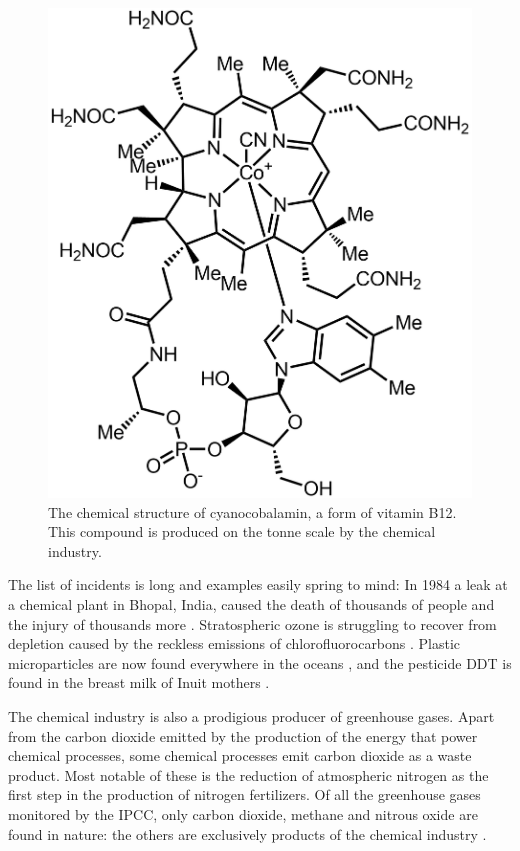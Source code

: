 \begin{figure}
\centering
\includegraphics[width=\textwidth]{Figures/Cyanocobalamin-b12.png}
\decoRule

\caption[Cyanocobalamin]{The chemical structure of cyanocobalamin, a form of
vitamin B12. This compound is produced on the tonne scale by the chemical
industry.}

\label{fig:vitb12}

\end{figure}

The list of incidents is long and examples easily spring to mind: In 1984 a leak
at a chemical plant in Bhopal, India, caused the death of thousands of people
and the injury of thousands more \autocite{Varma2005}.
Stratospheric ozone is struggling to recover from depletion caused by the
reckless emissions of chlorofluorocarbons \autocite{Ball2018}. Plastic
microparticles are now found everywhere in the oceans \autocite{Woodall2014},
and the pesticide DDT is found in the breast milk of Inuit mothers
\autocite{Gibson2016}.

The chemical industry is also a prodigious producer of greenhouse gases. Apart
from the carbon dioxide emitted by the production of the energy that power
chemical processes, some chemical processes emit carbon dioxide as a waste
product. Most notable of these is the reduction of atmospheric nitrogen as the
first step in the production of nitrogen fertilizers. Of all the greenhouse
gases monitored by the IPCC, only carbon dioxide, methane and nitrous oxide are
found in nature: the others are exclusively products of the chemical industry
\autocite{IPCC2014}.

